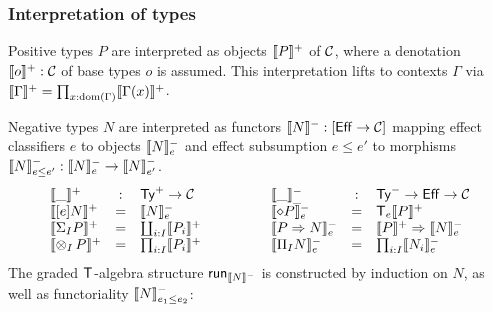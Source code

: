 \documentclass[acmsmall,review,anonymous]{acmart}\settopmatter{printfolios=true,printccs=false,printacmref=false}
\theoremstyle{remark}
\begin{document}
\subsubsection{Interpretation of types}

Positive types $P$ are interpreted as objects $\denp P$ of $\CC$,
where a denotation $\denp o : \CC$ of base types $o$ is assumed.
This interpretation lifts to contexts $\Gamma$ via $\denp \Gamma =
\prod_{x:\dom(\Gamma)} \denp{\Gamma(x)}$.

Negative types $N$ are interpreted
as functors
$\denn N : [\Eff \to \CC]$
mapping
effect classifiers $e$ to objects $\Denn N e$ and effect subsumption $e
\leq e'$ to morphisms $\Denn N {e \leq e'} : \Denn N e \to \Denn N {e'}$.
\[
\begin{array}{lcl}
  \denp\_ & : & \PTy \to \CC \\
  \denp{\thunkty e N} & = & \Denn N e \\
  \denp{\sumt I P} & = & \coprod_{i:I} \denp{P_i} \\
  \denp{\tupt I P} & = & \prod_{i:I} \denp{P_i} \\
\end{array}
\qquad\qquad
\begin{array}{lcl}
  \Denn\_\_ & : & \NTy \to \Eff \to \CC \\
  \Denn{\diamond P} e & = & \T[e] \denp P \\
  \Denn{P \To N}   e & = & \denp P \To \Denn N e \\
  \Denn{\rect I N} e & = & \prod_{i:I} \Denn{N_i}e \\
\end{array}
\]
The graded $\T$-algebra structure $\run[\denn N]$ is constructed by
induction on $N$, as well as functoriality $\Denn N {e_1 \leq e_2}$:
\end{document}
